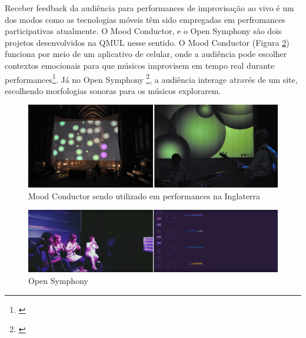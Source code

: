 
Receber feedback da audiência para performances de improvisação ao vivo é um dos modos como as tecnologias móveis têm sido empregadas em perfromances participativas atualmente. O Mood Conductor, e o Open Symphony são dois projetos desenvolvidos na QMUL nesse sentido. O Mood Conductor (Figura \ref{moodconductor}) funciona por meio de um aplicativo de celular, onde a audiência pode escolher contextos emocionais para que músicos improvisem em tempo real durante performances\footnote{\cite{Fazekas:2014}}. Já no Open Symphony \footnote{\cite{wu2017open}}, a audiência interage através de um site, escolhendo morfologias sonoras para os músicos explorarem. 

\begin{figure}
    \caption{\label{moodconductor}Mood Conductor sendo utilizado em performances na Inglaterra}
    \begin{center}
        \includegraphics[width=1\linewidth]{pictures/cap3/moodconductor}
    \end{center}
\end{figure}

\begin{figure}
    \caption{\label{moodconductor}Open Symphony}
    \begin{center}
        \includegraphics[width=1\linewidth]{pictures/cap3/opensymphony}
    \end{center}
\end{figure}

